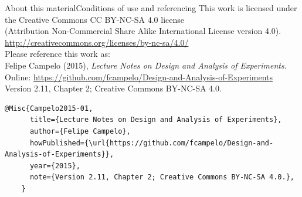\documentclass[t]{beamer}
\begin{document}
\begin{ftstf}{About this material}{Conditions of use and referencing}
\centering\footnotesize This work is licensed under the Creative Commons CC BY-NC-SA 4.0 license\\(Attribution Non-Commercial Share Alike International License version 4.0).\\
\vhalf
\url{http://creativecommons.org/licenses/by-nc-sa/4.0/}\\
\vone
\footnotesize Please reference this work as:\\
\footnotesize \flushleft Felipe Campelo (2015), \textit{Lecture Notes on Design and Analysis of Experiments}.\\Online: {\scriptsize\url{https://github.com/fcampelo/Design-and-Analysis-of-Experiments}}\\
Version 2.11, Chapter 2; Creative Commons BY-NC-SA 4.0.\\

\begin{Verbatim}[fontsize=\tiny]
    @Misc{Campelo2015-01,
      title={Lecture Notes on Design and Analysis of Experiments},
      author={Felipe Campelo},
      howPublished={\url{https://github.com/fcampelo/Design-and-Analysis-of-Experiments}},
      year={2015},
      note={Version 2.11, Chapter 2; Creative Commons BY-NC-SA 4.0.},
    }
\end{Verbatim}

\end{ftstf}
\end{document}
